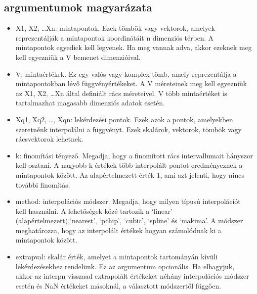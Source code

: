 \documentclass{article}
\begin{document}
\subsection{argumentumok magyarázata}
\begin{itemize}
    \item X1, X2, \ldots Xn: mintapontok. Ezek tömbök vagy vektorok, amelyek
          reprezentálják a mintapontok koordinátáit n dimenziós térben. A mintapontok
          egyediek kell legyenek. Ha meg vannak adva, akkor ezeknek meg kell egyezniük a
          V bemenet dimenzióival.
    \item V\@: mintaértékek. Ez egy valós vagy komplex tömb, amely reprezentálja a
          mintapontokban lévő függvényértékeket. A V méreteinek meg kell egyezniük az X1,
          X2, \ldots Xn által definiált rács méreteivel. V több mintaértéket is
          tartalmazhat magasabb dimenziós adatok esetén.
    \item Xq1, Xq2, \ldots, Xqn: lekérdezési pontok. Ezek azok a pontok, amelyekben
          szeretnénk interpolálni a függvényt. Ezek skalárok, vektorok, tömbök vagy
          rácsvektorok lehetnek.
    \item k: finomítási tényező. Megadja, hogy a finomított rács intervallumait hányszor
          kell osztani. A nagyobb k értékek több interpolált pontot eredményeznek a
          mintapontok között. Az alapértelmezett érték 1, ami azt jelenti, hogy nincs
          további finomítás.
    \item method: interpolációs módszer. Megadja, hogy milyen típusú interpolációt kell
          használni. A lehetőségek közé tartozik a `linear' (alapértelmezett),`nearest',
          `pchip', `cubic', `spline' és `makima'. A módszer meghatározza, hogy az
          interpolált értékek hogyan számolódnak ki a mintapontok között.

    \item extrapval: skalár érték, amelyet a mintapontok tartományán kívüli
          lekérdezésekhez rendelünk. Ez az argumentum opcionális. Ha elhagyjuk, akkor az
          interpn visszaad extrapolált értékeket néhány interpolációs módszer esetén és
          NaN értékeket másoknál, a választott módszertől függően.
\end{itemize}
\end{document}

